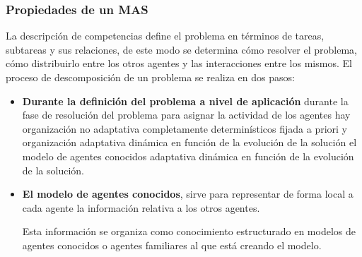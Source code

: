\documentclass[12pt, twoside, openright]{report} %
\begin{document}
\subsubsection{Propiedades de un MAS}
La descripción de competencias define el problema en términos de tareas, subtareas y sus relaciones, de este modo se determina cómo resolver el problema, cómo distribuirlo entre los otros agentes y las interacciones entre los mismos. El proceso de descomposición de un problema se realiza en dos pasos:
\begin{itemize}
	\item \textbf{Durante la definición del problema a nivel de aplicación} durante la fase de resolución del problema para asignar la actividad de los agentes hay organización no adaptativa completamente determinísticos fijada a priori y organización adaptativa dinámica en función de la evolución de la solución el modelo de agentes conocidos adaptativa dinámica en función de la evolución de la solución.
	\item \textbf{El modelo de agentes conocidos}, sirve para representar de forma local a cada agente la información relativa a los otros agentes. 
	
	Esta información se organiza como conocimiento estructurado en modelos de agentes conocidos o agentes familiares al que está creando el modelo. 
	

\end{itemize}
\end{document}
